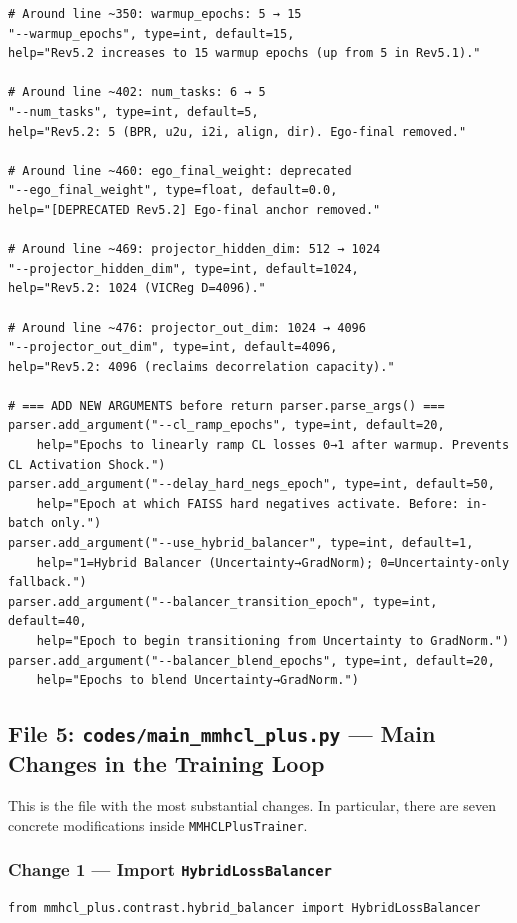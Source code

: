 \documentclass[11pt,a4paper]{article}
\begin{document}
\begin{lstlisting}[style=pythonstyle]
# Around line ~350: warmup_epochs: 5 → 15
"--warmup_epochs", type=int, default=15,
help="Rev5.2 increases to 15 warmup epochs (up from 5 in Rev5.1)."

# Around line ~402: num_tasks: 6 → 5
"--num_tasks", type=int, default=5,
help="Rev5.2: 5 (BPR, u2u, i2i, align, dir). Ego-final removed."

# Around line ~460: ego_final_weight: deprecated
"--ego_final_weight", type=float, default=0.0,
help="[DEPRECATED Rev5.2] Ego-final anchor removed."

# Around line ~469: projector_hidden_dim: 512 → 1024
"--projector_hidden_dim", type=int, default=1024,
help="Rev5.2: 1024 (VICReg D=4096)."

# Around line ~476: projector_out_dim: 1024 → 4096
"--projector_out_dim", type=int, default=4096,
help="Rev5.2: 4096 (reclaims decorrelation capacity)."

# === ADD NEW ARGUMENTS before return parser.parse_args() ===
parser.add_argument("--cl_ramp_epochs", type=int, default=20,
    help="Epochs to linearly ramp CL losses 0→1 after warmup. Prevents CL Activation Shock.")
parser.add_argument("--delay_hard_negs_epoch", type=int, default=50,
    help="Epoch at which FAISS hard negatives activate. Before: in-batch only.")
parser.add_argument("--use_hybrid_balancer", type=int, default=1,
    help="1=Hybrid Balancer (Uncertainty→GradNorm); 0=Uncertainty-only fallback.")
parser.add_argument("--balancer_transition_epoch", type=int, default=40,
    help="Epoch to begin transitioning from Uncertainty to GradNorm.")
parser.add_argument("--balancer_blend_epochs", type=int, default=20,
    help="Epochs to blend Uncertainty→GradNorm.")
\end{lstlisting}

\subsection{File 5: \texttt{codes/main\_mmhcl\_plus.py} --- Main Changes in the Training Loop}
This is the file with the most substantial changes. In particular, there are seven concrete modifications inside \texttt{MMHCLPlusTrainer}.

\subsubsection*{Change 1 --- Import \texttt{HybridLossBalancer}}
\begin{lstlisting}[style=pythonstyle]
from mmhcl_plus.contrast.hybrid_balancer import HybridLossBalancer
\end{lstlisting}
\end{document}
